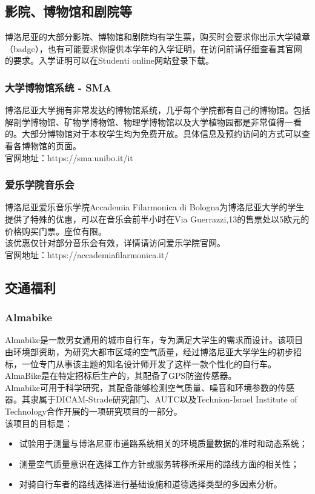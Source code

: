 \subsection{影院、博物馆和剧院等}

博洛尼亚的大部分影院、博物馆和剧院均有学生票，购买时会要求你出示大学徽章（badge），也有可能要求你提供本学年的入学证明，在访问前请仔细查看其官网的要求。入学证明可以在Studenti online网站登录下载。

\subsubsection{大学博物馆系统 - SMA}
博洛尼亚大学拥有非常发达的博物馆系统，几乎每个学院都有自己的博物馆。包括解剖学博物馆、矿物学博物馆、物理学博物馆以及大学植物园都是非常值得一看的。大部分博物馆对于本校学生均为免费开放。具体信息及预约访问的方式可以查看各博物馆的页面。\\
官网地址：https://sma.unibo.it/it

\subsubsection{爱乐学院音乐会}
博洛尼亚爱乐音乐学院Accademia Filarmonica di Bologna为博洛尼亚大学的学生提供了特殊的优惠，可以在音乐会前半小时在Via Guerrazzi,13的售票处以5欧元的价格购买门票。座位有限。\\
该优惠仅针对部分音乐会有效，详情请访问爱乐学院官网。\\
官网地址：https://accademiafilarmonica.it/

\subsection{交通福利}

\subsubsection{Almabike}
Almabike是一款男女通用的城市自行车，专为满足大学生的需求而设计。该项目由环境部资助，为研究大都市区域的空气质量，经过博洛尼亚大学学生的初步招标，一位专门从事该主题的知名设计师开发了这样一款个性化的自行车。AlmaBike是在特定招标后生产的，其配备了GPS防盗传感器。\\
Almabike可用于科学研究，其配备能够检测空气质量、噪音和环境参数的传感器。其隶属于DICAM-Strade研究部门、AUTC以及Technion-Israel Institute of Technology合作开展的一项研究项目的一部分。\\
该项目的目标是：
\begin{itemize}
 \item 试验用于测量与博洛尼亚市道路系统相关的环境质量数据的准时和动态系统；
 \item 测量空气质量意识在选择工作方针或服务转移所采用的路线方面的相关性； 
 \item 对骑自行车者的路线选择进行基础设施和道德选择类型的多因素分析。
\end{itemize} 

